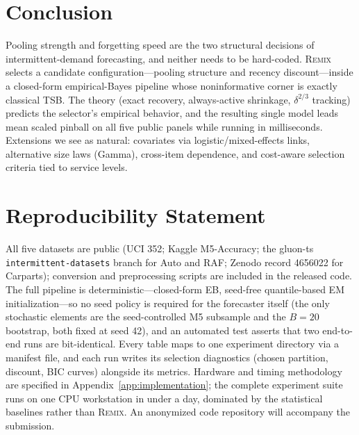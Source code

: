 \documentclass[twocolumn,10pt]{article}
\newcommand{\REMIX}{\textsc{Remix}}
\begin{document}
\section{Conclusion}\label{sec:conclusion}
Pooling strength and forgetting speed are the two structural decisions of
intermittent-demand forecasting, and neither needs to be hard-coded.
\REMIX{} selects a candidate configuration---pooling structure and recency discount---inside a
closed-form empirical-Bayes pipeline whose noninformative corner is
exactly classical TSB. The theory (exact recovery, always-active
shrinkage, $\delta^{2/3}$ tracking) predicts the selector's empirical
behavior, and the resulting single model leads mean scaled pinball on all
five public panels while running in milliseconds. Extensions we see as
natural: covariates via logistic/mixed-effects links, alternative size
laws (Gamma), cross-item dependence, and cost-aware selection criteria
tied to service levels.

\section*{Reproducibility Statement}
All five datasets are public (UCI 352; Kaggle M5-Accuracy; the gluon-ts
\texttt{intermittent-datasets} branch for Auto and RAF; Zenodo record
4656022 for Carparts); conversion and preprocessing scripts are included
in the released code. The full pipeline is deterministic---closed-form
EB, seed-free quantile-based EM initialization---so no seed policy is
required for the forecaster itself (the only stochastic elements are the
seed-controlled M5 subsample and the $B{=}20$ bootstrap, both fixed at
seed 42), and an automated test asserts that two end-to-end runs are
bit-identical. Every table maps to one experiment directory via a
manifest file, and each run writes its selection diagnostics (chosen
partition, discount, BIC curves) alongside its metrics. Hardware and
timing methodology are specified in Appendix~\ref{app:implementation};
the complete experiment suite runs on one CPU workstation in under a
day, dominated by the statistical baselines rather than \REMIX{}. An
anonymized code repository will accompany the submission.
\end{document}

